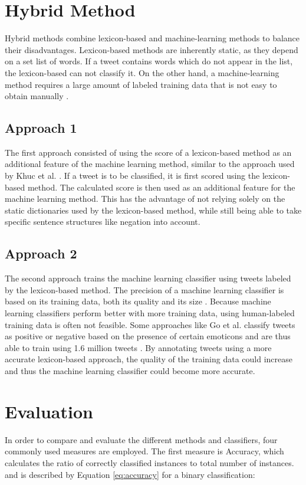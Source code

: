 \section{Hybrid Method}
Hybrid methods combine lexicon-based and machine-learning methods to balance their disadvantages. Lexicon-based methods are inherently static, as they depend on a set list of words. If a tweet contains words which do not appear in the list, the lexicon-based can not classify it. On the other hand, a machine-learning method requires a large amount of labeled training data that is not easy to obtain manually \cite{DBLP:journals/csur/GiachanouC16}.

\subsection{Approach 1}
The first approach consisted of using the score of a lexicon-based method as an additional feature of the machine learning method, similar to the approach used by Khuc et al. \cite{khuc}. If a tweet is to be classified, it is first scored using the lexicon-based method. The calculated score is then used as an additional feature for the machine learning method. This has the advantage of not relying solely on the static dictionaries used by the lexicon-based method, while still being able to take specific sentence structures like negation into account.
\subsection{Approach 2}
The second approach trains the machine learning classifier using tweets labeled by the lexicon-based method. The precision of a machine learning classifier is based on its training data, both its quality and its size \cite{DBLP:journals/csur/GiachanouC16}. Because machine learning classifiers perform better with more training data, using human-labeled training data is often not feasible. Some approaches like Go et al. classify tweets as positive or negative based on the presence of certain emoticons and are thus able to train using 1.6 million tweets \cite{GoBHaHua2009}. By annotating tweets using a more accurate lexicon-based approach, the quality of the training data could increase and thus the machine learning classifier could become more accurate.

\section{Evaluation}
In order to compare and evaluate the different methods and classifiers, four commonly used measures are employed. The first measure is Accuracy, which calculates the ratio of correctly classified instances to total number of instances. and is described by Equation \eqref{eq:accuracy} for a binary classification:

